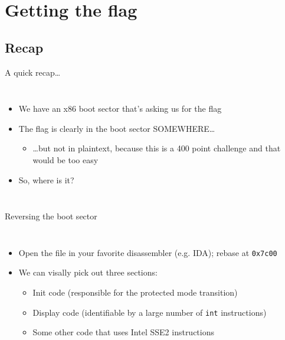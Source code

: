 
\section{Getting the flag}

\subsection{Recap}

\begin{frame}{A quick recap\ldots}
    \begin{columns}
        \begin{itemize}
            \item<1-> We have an x86 boot sector that's asking us for the flag
            \item<2-> The flag is clearly in the boot sector SOMEWHERE\ldots
            \begin{itemize}
                \item<3-> \ldots but not in plaintext, because this is a 400
                          point challenge and that would be too easy
            \end{itemize}
            \item<4-> So, where is it?
        \end{itemize}
    \end{columns}
\end{frame}

\begin{frame}{Reversing the boot sector}
    \begin{columns}
        \begin{itemize}
            \item<1-> Open the file in your favorite disassembler (e.g. IDA);
                      rebase at \texttt{0x7c00}
            \item<2-> We can visally pick out three sections:
            \begin{itemize}
                \item<2-> Init code (responsible for the protected
                          mode transition)
                \item<2-> Display code (identifiable by a large number of
                          \texttt{int} instructions)
                \item<2-> Some other code that uses Intel SSE2 instructions
            \end{itemize}
        \end{itemize}
    \end{columns}
\end{frame}

